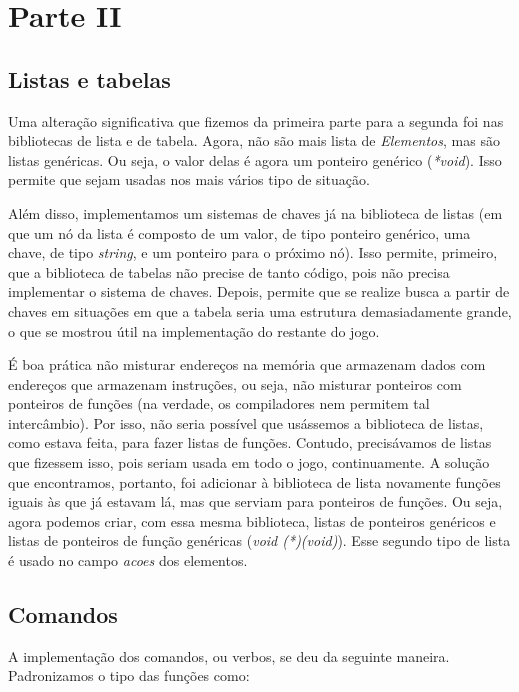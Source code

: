 \documentclass{article}
\begin{document}
\section{Parte II}

\subsection{Listas e tabelas}

Uma alteração significativa que fizemos da primeira parte para a segunda foi nas
bibliotecas de lista e de tabela. Agora, não são mais lista de\emph{ Elementos},
mas são listas genéricas. Ou seja, o valor delas é agora um ponteiro genérico
(\emph{*void}). Isso permite que sejam usadas nos mais vários tipo de situação.

Além disso, implementamos um sistemas de chaves já na biblioteca de listas (em
que um nó da lista é composto de um valor, de tipo ponteiro genérico, uma chave,
de tipo \emph{string}, e um ponteiro para o próximo nó). Isso permite, primeiro,
que a biblioteca de tabelas não precise de tanto código, pois não precisa
implementar o sistema de chaves. Depois, permite que se realize busca a partir
de chaves em situações em que a tabela seria uma estrutura demasiadamente
grande, o que se mostrou útil na implementação do restante do jogo.

É boa prática não misturar endereços na memória que armazenam dados com
endereços que armazenam instruções, ou seja, não misturar ponteiros com
ponteiros de funções (na verdade, os compiladores nem permitem tal intercâmbio).
Por isso, não seria possível que usássemos a biblioteca de listas, como estava
feita, para fazer listas de funções. Contudo, precisávamos de listas que
fizessem isso, pois seriam usada em todo o jogo, continuamente. A solução que
encontramos, portanto, foi adicionar à biblioteca de lista novamente funções
iguais às que já estavam lá, mas que serviam para ponteiros de funções. Ou seja,
agora podemos criar, com essa mesma biblioteca, listas de ponteiros genéricos e
listas de ponteiros de função genéricas (\emph{void (*)(void)}). Esse segundo
tipo de lista é usado no campo\emph{ acoes} dos elementos.

\subsection{Comandos}\label{comandos}

A implementação dos comandos, ou verbos, se deu da seguinte maneira.
Padronizamos o tipo das funções como:
\end{document}
